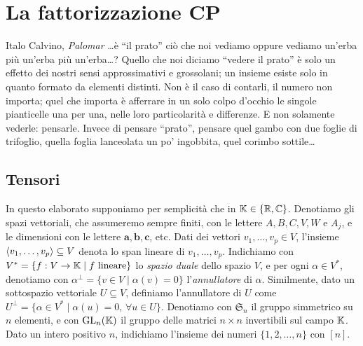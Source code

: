 \chapter{La fattorizzazione CP}
\label{chp:tensors_intro}

\begin{chapquote}{Italo Calvino, \textit{Palomar}}
	\ldots è ``il prato'' ciò che noi vediamo
	oppure vediamo un'erba più un'erba più un'erba…? Quello che noi diciamo ``vedere il
	prato'' è solo un effetto dei nostri sensi approssimativi e grossolani; un insieme esiste
	solo in quanto formato da elementi distinti. Non è il caso di contarli, il numero non
	importa; quel che importa è afferrare in un solo colpo d'occhio le singole pianticelle
	una per una, nelle loro particolarità e differenze. E non solamente vederle: pensarle.
	Invece di pensare ``prato'', pensare quel gambo con due foglie di trifoglio, quella
	foglia lanceolata un po' ingobbita, quel corimbo sottile\ldots \end{chapquote}

\section{Tensori}

In questo elaborato supponiamo per semplicità che in $ \mathbb{K} \in \{\mathbb{R}, \mathbb{C}\}  $. Denotiamo gli spazi vettoriali, che
assumeremo sempre finiti, con le lettere $  A, B, C, V, W$ e $A_j$, e le dimensioni con le
lettere $ \bm{a}, \bm{b}, \bm{c} $, etc. Dati dei vettori $ v_1,\ldots,v_p \in V$, l'insieme
$ \angb{v_1,\ldots,v_p} \subseteq V $ denota lo span lineare di $ v_1, \ldots, v_p $. Indichiamo con $ V^* = \{ f : V \to \mathbb{K} \mid f \text{ lineare} \} $ lo \emph{spazio duale} dello spazio $ V $, e per ogni $ \alpha \in V^* $, denotiamo con $
	\alpha^\perp = \{v \in V \mid \alpha(v) = 0\}  $ l'\emph{annullatore} di $ \alpha $. Similmente,
dato un sottospazio vettoriale $ U \subseteq V $, definiamo l'annullatore di $ U $ come $ U^\perp =
	\{\alpha \in V^* \mid \alpha(u) = 0, \, \forall u \in U\}  $.
Denotiamo con $ \mathfrak{S}_n $ il gruppo simmetrico su $ n $ elementi, e con $ \operatorname{GL}_{n}(\mathbb{K}) $ il
gruppo delle matrici $ n \times n $ invertibili sul campo $ \mathbb{K} $. Dato un intero positivo $ n $,
indichiamo l'insieme dei numeri $ \{1, 2, \ldots, n\}  $ con  $ [n] $.


